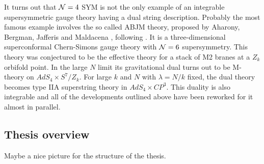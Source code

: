 It turns out that $\mathcal{N}=4$ SYM is not the only example of an integrable supersymmetric gauge theory having a dual string description.
Probably the most famous example involves the so called ABJM theory, proposed by Aharony, Bergman, Jafferis and Maldacena \cite{Aharony:2008ug}, following \cite{Schwarz:2004yj, Bagger:2006sk, Gaiotto:2007qi}.
It is a three-dimensional superconformal Chern-Simons gauge theory with $\mathcal{N}=6$ supersymmetry.
This theory was conjectured to be the effective theory for a stack of M2 branes at a $Z_k$ orbifold
point. 
In the large $N$ limit its gravitational dual turns out to be M-theory on $AdS_4 \times S^7 / Z_k$. 
For large $k$ and $N$ with $\lambda = N/k$ fixed, the dual theory becomes type IIA superstring theory in $AdS_4 \times CP^3$.
This duality is also integrable and all of the developments outlined above have been reworked for it almost in parallel. 


\subsection{Thesis overview}

Maybe a nice picture for the structure of the thesis.
